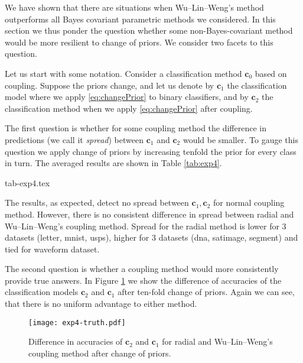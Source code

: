 We have shown that there are situations when Wu--Lin--Weng's method outperforms all Bayes covariant parametric methods we considered. In this section we thus ponder the question whether some non-Bayes-covariant method would be more resilient to change of priors. We consider two facets to this question.

Let us start with some notation. Consider a classification method $\boldsymbol{c}_0$ based on coupling. Suppose the priors change, and let us denote by $\boldsymbol{c}_1$ the classification model where we apply \eqref{eq:changePrior} to binary classifiers, and by $\boldsymbol{c}_2$ the classification method when we apply \eqref{eq:changePrior} after coupling. 

The first question is whether for some coupling method the difference in predictions (we call it \emph{spread}) between $\boldsymbol{c}_1$ and $\boldsymbol{c}_2$ would be smaller. To gauge this question we apply change of priors by increasing tenfold the prior for every class in turn.  The averaged results are shown in Table \ref{tab:exp4}. 

 {tab-exp4.tex}

The results, as expected, detect no spread between $\boldsymbol{c}_1, \boldsymbol{c}_2$ for normal coupling method. However, there is no consistent difference in spread between radial and Wu--Lin--Weng's coupling method. Spread for the radial method is lower for 3 datasets (letter, mnist, usps), higher for 3 datasets (dna, satimage, segment) and tied for waveform dataset.

The second question is whether a coupling method would more consistently provide true answers. In Figure \ref{fig:score} we show the difference of accuracies of the classification models $\boldsymbol{c}_2$ and $\boldsymbol{c}_1$ after ten-fold change of priors. Again we can see, that there is no uniform advantage to either method.


\begin{figure}[!ht]
	\texttt{[image: exp4-truth.pdf]}
	\caption{Difference in accuracies of $\boldsymbol{c}_2$ and $\boldsymbol{c}_1$ for radial and Wu--Lin--Weng's coupling method after change of priors.}
	\label{fig:score}
\end{figure}
